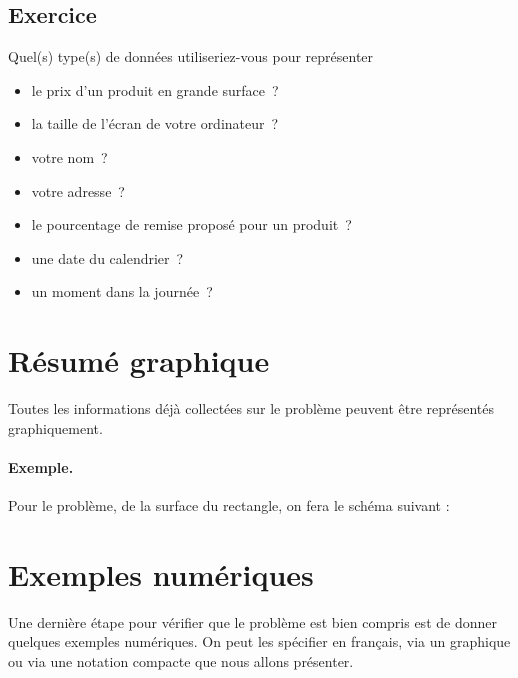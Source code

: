 		\subsection{Exercice}
		
			Quel(s) type(s) de données utiliseriez-vous pour représenter 
			\begin{itemize}
				\item le prix d’un produit en grande surface~?
				\item la taille de l'écran de votre ordinateur~?
				\item votre nom~?
				\item votre adresse~?
				\item le pourcentage de remise proposé pour un produit~?
				\item une date du calendrier~?
				\item un moment dans la journée~?
			\end{itemize}
			
	\section{Résumé graphique}
	
		Toutes les informations déjà collectées sur le problème
		peuvent être représentés graphiquement.
	
		\begin{Emphase}
			\paragraph{Exemple.}
			Pour le problème, de la surface du rectangle, 
			on fera le schéma suivant :
			
			\center{}	
		\end{Emphase}
		
	\section{Exemples numériques}
	
		Une dernière étape pour vérifier que le problème
		est bien compris est de donner quelques exemples numériques.
		On peut les spécifier en français, 
		via un graphique ou via une notation compacte
		que nous allons présenter.
	
